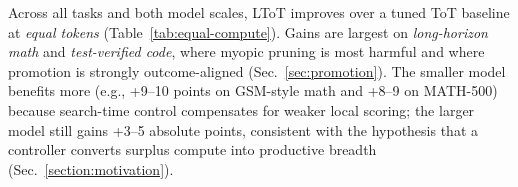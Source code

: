 \documentclass{article}
\begin{document}
\begin{table}[t]
\centering
\caption{Success@1 / Pass@1 at equal compute (S: Llama-3.1-8B, M: Mixtral-8$\times$7B). \emph{Forecasted} means (95\% CI widths omitted for brevity).}
\vspace{0.3em}
\label{tab:equal-compute}
\end{table}

Across all tasks and both model scales, LToT improves over a tuned ToT baseline at \emph{equal tokens} (Table~\ref{tab:equal-compute}).
Gains are largest on \emph{long-horizon math} and \emph{test-verified code}, where myopic pruning is most harmful and where promotion is strongly outcome-aligned (Sec.~\ref{sec:promotion}).
The smaller model benefits more (e.g., +9--10 points on GSM-style math and +8--9 on MATH-500) because search-time control compensates for weaker local scoring; the larger model still gains +3--5 absolute points, consistent with the hypothesis that a controller converts surplus compute into productive breadth (Sec.~\ref{section:motivation}).
\end{document}
